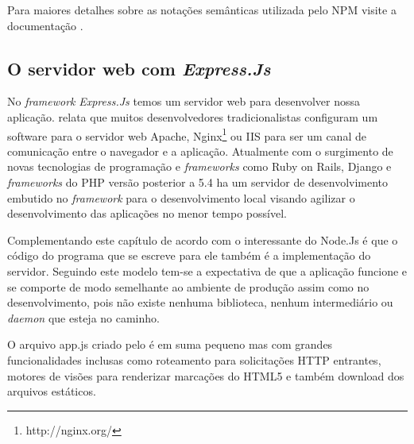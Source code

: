   Para maiores detalhes sobre as notações semânticas utilizada pelo \ac{NPM} visite a documentação \cite{Semver:2013}.

\subsection{O servidor web com \textit{Express.Js}}
\label{servidor-web-express-js}

  No \textit{framework} \textit{Express.Js} temos um servidor web para desenvolver nossa aplicação. 
  \cite{Wilson:2013} relata que muitos desenvolvedores tradicionalistas configuram um software para o servidor web Apache,
  Nginx\footnote{http://nginx.org/} ou IIS para ser um canal de comunicação entre o 
  navegador e a aplicação.
  Atualmente com o surgimento de novas tecnologias de programação e \textit{frameworks} como Ruby on Rails, 
  Django e \textit{frameworks} do \ac{PHP} versão posterior a 5.4 ha um servidor de desenvolvimento embutido no \textit{framework}
  para o desenvolvimento local visando agilizar o desenvolvimento das aplicações no menor tempo possível.
  
  Complementando este capítulo de acordo com \cite{Wilson:2013} o interessante do Node.Js é que o código do 
  programa que se escreve para ele também é a implementação do servidor. 
  Seguindo este modelo tem-se a expectativa de que a aplicação funcione e se comporte de modo semelhante 
  ao ambiente de produção assim como no desenvolvimento, pois não existe nenhuma biblioteca, nenhum intermediário 
  ou \textit{daemon} que esteja no caminho.
  
  O arquivo app.js criado pelo  é em suma pequeno mas com grandes funcionalidades inclusas como 
  roteamento para solicitações \ac{HTTP} entrantes, motores de visões para renderizar marcações do HTML5
  e também download dos arquivos estáticos.